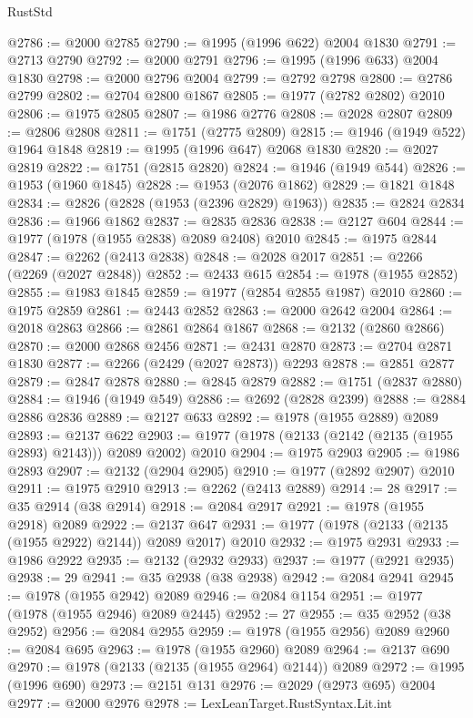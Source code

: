 \begin{lexlean}{RustStd}
\begin{coremodule}
@2786 := @2000 @2785
@2790 := @1995 (@1996 @622) @2004 @1830
@2791 := @2713 @2790
@2792 := @2000 @2791
@2796 := @1995 (@1996 @633) @2004 @1830
@2798 := @2000 @2796 @2004
@2799 := @2792 @2798
@2800 := @2786 @2799
@2802 := @2704 @2800 @1867
@2805 := @1977 (@2782 @2802) @2010
@2806 := @1975 @2805
@2807 := @1986 @2776
@2808 := @2028 @2807
@2809 := @2806 @2808
@2811 := @1751 (@2775 @2809)
@2815 := @1946 (@1949 @522) @1964 @1848
@2819 := @1995 (@1996 @647) @2068 @1830
@2820 := @2027 @2819
@2822 := @1751 (@2815 @2820)
@2824 := @1946 (@1949 @544)
@2826 := @1953 (@1960 @1845)
@2828 := @1953 (@2076 @1862)
@2829 := @1821 @1848
@2834 := @2826 (@2828 (@1953 (@2396 @2829) @1963))
@2835 := @2824 @2834
@2836 := @1966 @1862
@2837 := @2835 @2836
@2838 := @2127 @604
@2844 := @1977 (@1978 (@1955 @2838) @2089 @2408) @2010
@2845 := @1975 @2844
@2847 := @2262 (@2413 @2838)
@2848 := @2028 @2017
@2851 := @2266 (@2269 (@2027 @2848))
@2852 := @2433 @615
@2854 := @1978 (@1955 @2852)
@2855 := @1983 @1845
@2859 := @1977 (@2854 @2855 @1987) @2010
@2860 := @1975 @2859
@2861 := @2443 @2852
@2863 := @2000 @2642 @2004
@2864 := @2018 @2863
@2866 := @2861 @2864 @1867
@2868 := @2132 (@2860 @2866)
@2870 := @2000 @2868 @2456
@2871 := @2431 @2870
@2873 := @2704 @2871 @1830
@2877 := @2266 (@2429 (@2027 @2873)) @2293
@2878 := @2851 @2877
@2879 := @2847 @2878
@2880 := @2845 @2879
@2882 := @1751 (@2837 @2880)
@2884 := @1946 (@1949 @549)
@2886 := @2692 (@2828 @2399)
@2888 := @2884 @2886 @2836
@2889 := @2127 @633
@2892 := @1978 (@1955 @2889) @2089
@2893 := @2137 @622
@2903 := @1977 (@1978 (@2133 (@2142 (@2135 (@1955 @2893) @2143))) @2089 @2002) @2010
@2904 := @1975 @2903
@2905 := @1986 @2893
@2907 := @2132 (@2904 @2905)
@2910 := @1977 (@2892 @2907) @2010
@2911 := @1975 @2910
@2913 := @2262 (@2413 @2889)
@2914 := 28
@2917 := @35 @2914 (@38 @2914)
@2918 := @2084 @2917
@2921 := @1978 (@1955 @2918) @2089
@2922 := @2137 @647
@2931 := @1977 (@1978 (@2133 (@2135 (@1955 @2922) @2144)) @2089 @2017) @2010
@2932 := @1975 @2931
@2933 := @1986 @2922
@2935 := @2132 (@2932 @2933)
@2937 := @1977 (@2921 @2935)
@2938 := 29
@2941 := @35 @2938 (@38 @2938)
@2942 := @2084 @2941
@2945 := @1978 (@1955 @2942) @2089
@2946 := @2084 @1154
@2951 := @1977 (@1978 (@1955 @2946) @2089 @2445)
@2952 := 27
@2955 := @35 @2952 (@38 @2952)
@2956 := @2084 @2955
@2959 := @1978 (@1955 @2956) @2089
@2960 := @2084 @695
@2963 := @1978 (@1955 @2960) @2089
@2964 := @2137 @690
@2970 := @1978 (@2133 (@2135 (@1955 @2964) @2144)) @2089
@2972 := @1995 (@1996 @690)
@2973 := @2151 @131
@2976 := @2029 (@2973 @695) @2004
@2977 := @2000 @2976
@2978 := LexLeanTarget.RustSyntax.Lit.int

\end{coremodule}
\end{lexlean}

